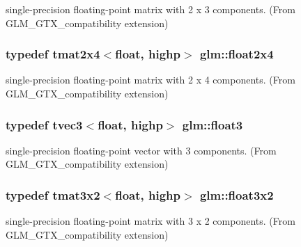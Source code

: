 single-\/precision floating-\/point matrix with 2 x 3 components. (From G\+L\+M\+\_\+\+G\+T\+X\+\_\+compatibility extension) 

\hypertarget{group__gtx__compatibility_ga33955674c7eee16728dd45fc10dc9547}{}
\subsubsection[{float2x4}]{\setlength{\rightskip}{0pt plus 5cm}typedef tmat2x4$<$float, highp$>$ {\bf glm\+::float2x4}}\label{group__gtx__compatibility_ga33955674c7eee16728dd45fc10dc9547}


single-\/precision floating-\/point matrix with 2 x 4 components. (From G\+L\+M\+\_\+\+G\+T\+X\+\_\+compatibility extension) 

\hypertarget{group__gtx__compatibility_ga25f20d2c12f9b5f3917467e92899ea5a}{}
\subsubsection[{float3}]{\setlength{\rightskip}{0pt plus 5cm}typedef tvec3$<$float, highp$>$ {\bf glm\+::float3}}\label{group__gtx__compatibility_ga25f20d2c12f9b5f3917467e92899ea5a}


single-\/precision floating-\/point vector with 3 components. (From G\+L\+M\+\_\+\+G\+T\+X\+\_\+compatibility extension) 

\hypertarget{group__gtx__compatibility_ga2d2b535c9bad9274456ae12676bc6865}{}
\subsubsection[{float3x2}]{\setlength{\rightskip}{0pt plus 5cm}typedef tmat3x2$<$float, highp$>$ {\bf glm\+::float3x2}}\label{group__gtx__compatibility_ga2d2b535c9bad9274456ae12676bc6865}


single-\/precision floating-\/point matrix with 3 x 2 components. (From G\+L\+M\+\_\+\+G\+T\+X\+\_\+compatibility extension) 

